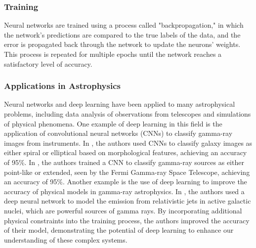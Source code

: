 \subsubsection{Training}
Neural networks are trained using a process called "backpropagation," in which the network's predictions are compared to the true labels of the data, and the error is propagated back through the network to update the neurons' weights. This process is repeated for multiple epochs until the network reaches a satisfactory level of accuracy.

\subsubsection{Applications in Astrophysics}
Neural networks and deep learning have been applied to many astrophysical problems, including data analysis of observations from telescopes and simulations of physical phenomena. 
One example of deep learning in this field is the application of convolutional neural networks (CNNs) to classify gamma-ray images from instruments. In \cite{dieleman2015galaxy}, the authors used CNNs to classify galaxy images as either spiral or elliptical based on morphological features, achieving an accuracy of 95\%. In \cite{lopez2018automatic}, the authors trained a CNN to classify gamma-ray sources as either point-like or extended, seen by the Fermi Gamma-ray Space Telescope, achieving an accuracy of 95\%. Another example is the use of deep learning to improve the accuracy of physical models in gamma-ray astrophysics. In \cite{perez2019deep}, the authors used a deep neural network to model the emission from relativistic jets in active galactic nuclei, which are powerful sources of gamma rays. By incorporating additional physical constraints into the training process, the authors improved the accuracy of their model, demonstrating the potential of deep learning to enhance our understanding of these complex systems.

